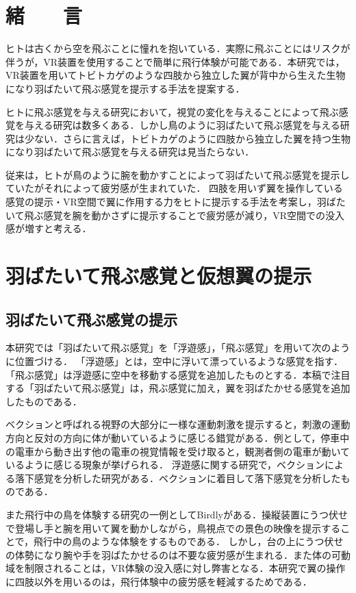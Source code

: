 \begin{small}
\section{緒　　言}
  ヒトは古くから空を飛ぶことに憧れを抱いている．実際に飛ぶことにはリスクが伴うが，VR装置を使用することで簡単に飛行体験が可能である．本研究では，VR装置を用いてトビトカゲのような四肢から独立した翼が背中から生えた生物になり羽ばたいて飛ぶ感覚を提示する手法を提案する．
  
  ヒトに飛ぶ感覚を与える研究において，視覚の変化を与えることによって飛ぶ感覚を与える研究は数多くある．しかし鳥のように羽ばたいて飛ぶ感覚を与える研究は少ない．さらに言えば，トビトカゲのように四肢から独立した翼を持つ生物になり羽ばたいて飛ぶ感覚を与える研究は見当たらない．

  従来は，ヒトが鳥のように腕を動かすことによって羽ばたいて飛ぶ感覚を提示していたがそれによって疲労感が生まれていた．
  四肢を用いず翼を操作している感覚の提示・VR空間で翼に作用する力をヒトに提示する手法を考案し，羽ばたいて飛ぶ感覚を腕を動かさずに提示することで疲労感が減り，VR空間での没入感が増すと考える．


\section{羽ばたいて飛ぶ感覚と仮想翼の提示}
  \subsection{羽ばたいて飛ぶ感覚の提示}
    本研究では「羽ばたいて飛ぶ感覚」を「浮遊感」，「飛ぶ感覚」を用いて次のように位置づける．
    「浮遊感」とは，空中に浮いて漂っているような感覚を指す．「飛ぶ感覚」は浮遊感に空中を移動する感覚を追加したものとする．本稿で注目する「羽ばたいて飛ぶ感覚」は，飛ぶ感覚に加え，翼を羽ばたかせる感覚を追加したものである．

    ベクションと呼ばれる視野の大部分に一様な運動刺激を提示すると，刺激の運動方向と反対の方向に体が動いているように感じる錯覚がある\cite{妹尾武治2014ベクションとその周辺の近年の動向}．例として，停車中の電車から動き出す他の電車の視覚情報を受け取ると，観測者側の電車が動いているように感じる現象が挙げられる．
    浮遊感に関する研究で，ベクションによる落下感覚を分析した研究がある\cite{奥川夏輝2017VR空間における視覚刺激によって発生する落下感覚の分析}．ベクションに着目して落下感覚を分析したものである．

    また飛行中の鳥を体験する研究の一例としてBirdly\cite{rheiner2014birdly}がある．操縦装置にうつ伏せで登場し手と腕を用いて翼を動かしながら，鳥視点での景色の映像を提示することで，飛行中の鳥のような体験をするものである．
    しかし，台の上にうつ伏せの体勢になり腕や手を羽ばたかせるのは不要な疲労感が生まれる．また体の可動域を制限されることは，VR体験の没入感に対し弊害となる．本研究で翼の操作に四肢以外を用いるのは，飛行体験中の疲労感を軽減するためである．


\end{small}
